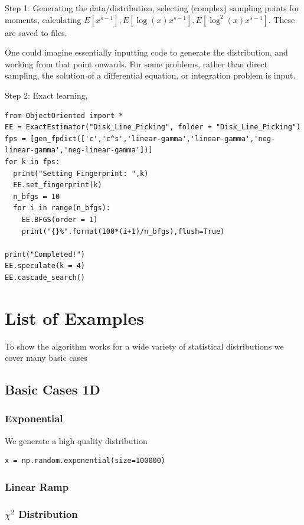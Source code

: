 \documentclass{article}
\begin{document}
Step 1:	Generating the data/distribution, selecting (complex) sampling points for moments, calculating $E[x^{s-1}], E[\log(x) x^{s-1}], E[\log^2(x) x^{s-1}]$. These are saved to files.

One could imagine essentially inputting code to generate the distribution, and working from that point onwards. For some problems, rather than direct sampling, the solution of a differential equation, or integration problem is input.


Step 2: Exact learning,
\begin{verbatim}
from ObjectOriented import *
EE = ExactEstimator("Disk_Line_Picking", folder = "Disk_Line_Picking")
fps = [gen_fpdict(['c','c^s','linear-gamma','linear-gamma','neg-linear-gamma','neg-linear-gamma'])]
for k in fps:
  print("Setting Fingerprint: ",k)
  EE.set_fingerprint(k)
  n_bfgs = 10
  for i in range(n_bfgs):
    EE.BFGS(order = 1)
    print("{}%".format(100*(i+1)/n_bfgs),flush=True)

print("Completed!")
EE.speculate(k = 4)
EE.cascade_search()
\end{verbatim}



\section{List of Examples}
To show the algorithm works for a wide variety of statistical distributions we cover many basic cases
\subsection{Basic Cases 1D}

\subsubsection{Exponential}
We generate a high quality distribution
\begin{verbatim}
x = np.random.exponential(size=100000)
\end{verbatim}

\subsubsection{Linear Ramp}

\subsubsection{$\chi^2$ Distribution}
\end{document}
